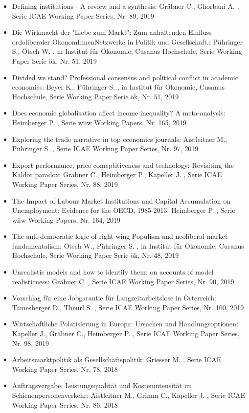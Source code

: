 \begin{itemize}
\item Defining institutions - A review and a synthesis: Gräbner C., Ghorbani A. , Serie ICAE Working Paper Series, Nr. 89, 2019
\item Die Wirkmacht der "Liebe zum Markt": Zum anhaltenden Einfluss ordoliberaler ÖkonomInnenNetzwerke in Politik und Gesellschaft.: Pühringer S., Ötsch W. , in Institut für Ökonomie, Cusanus Hochschule, Serie Working Paper Serie ök, Nr. 51, 2019
\item Divided we stand? Professional consensus and political conflict in academic economics: Beyer K., Pühringer S. , in Institut für Ökonomie, Cusanus Hochschule, Serie Working Paper Serie ök, Nr. 51, 2019
\item Does economic globalisation affect income inequality? A meta-analysis: Heimberger P. , Serie wiiw Working Papers, Nr. 165, 2019
\item Exploring the trade narrative in top economics journals: Aistleitner M., Pühringer S. , Serie ICAE Working Paper Series, Nr. 97, 2019
\item Export performance, price comeptitiveness and technology: Revisiting the Kaldor paradox: Gräbner C., Heimberger P., Kapeller J. , Serie ICAE Working Paper Series, Nr. 88, 2019
\item The Impact of Labour Market Institutions and Capital Accumulation on Unemployment: Evidence for the OECD, 1985-2013: Heimberger P. , Serie wiiw Working Papers, Nr. 164, 2019
\item The anti-democratic logic of right-wing Populism and neoliberal market-fundamentalism: Ötsch W., Pühringer S. , in Institut für Ökonomie, Cusanus Hochschule, Serie Working Paper Serie ök, Nr. 48, 2019
\item Unrealistic models and how to identify them: on accounts of model realisticness: Gräbner C. , Serie ICAE Working Paper Series, Nr. 90, 2019
\item Vorschlag für eine Jobgarantie für Langzeitarbeitslose in Österreich: Tamesberger D., Theurl S. , Serie ICAE Working Paper Series, Nr. 100, 2019
\item Wirtschaftliche Polarisierung in Europa: Ursachen und Handlungsoptionen: Kapeller J., Gräbner C., Heimberger P. , Serie ICAE Working Paper Series, Nr. 98, 2019
\item Arbeitsmarktpolitik als Gesellschaftspolitik: Griesser M. , Serie ICAE Working Paper Series, Nr. 78, 2018
\item Auftragsvergabe, Leistungsqualität und Kostenintensität im Schienenpersonenverkehr: Aistleitner M., Grimm C., Kapeller J. , Serie ICAE Working Paper Series, Nr. 86, 2018

\end{itemize}

